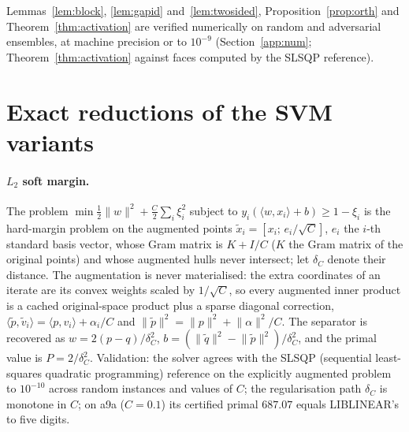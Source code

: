 \documentclass[pdflatex,sn-apa]{sn-jnl}%
\theoremstyle{thmstyleone}
\theoremstyle{thmstyletwo}
\newcommand{\ip}[2]{\langle #1, #2 \rangle}
\newcommand{\norm}[1]{\lVert #1 \rVert}
\begin{document}
Lemmas~\ref{lem:block}, \ref{lem:gapid} and~\ref{lem:twosided},
Proposition~\ref{prop:orth} and Theorem~\ref{thm:activation} are
verified numerically on random and adversarial ensembles, at machine
precision or to $10^{-9}$ (Section~\ref{app:num}; Theorem~\ref{thm:activation}
against faces computed by the SLSQP reference).



\section{Exact reductions of the SVM variants}\label{app:red}

\paragraph{$L_2$ soft margin.} The problem
$\min\tfrac12\norm w^2+\tfrac C2\sum_i\xi_i^2$ subject to
$y_i(\ip{w}{x_i}+b)\ge1-\xi_i$ is the hard-margin problem
on the augmented points $\tilde x_i=[x_i;\,e_i/\sqrt C]$, $e_i$ the
$i$-th standard basis vector, whose Gram
matrix is $K+I/C$ ($K$ the Gram matrix of the original points) and whose
augmented hulls never intersect; let $\delta_C$ denote their distance. The
augmentation is never materialised: the extra coordinates of an iterate
are its convex weights scaled by $1/\sqrt C$, so every augmented inner product is a
cached original-space product plus a sparse diagonal correction,
$\ip{\tilde p}{\tilde v_i}=\ip{p}{v_i}+\alpha_i/C$ and
$\norm{\tilde p}^2=\norm p^2+\norm\alpha^2/C$. The separator is recovered
as $w=2(p-q)/\delta_C^2$, $b=(\norm{\tilde q}^2-\norm{\tilde p}^2)/\delta_C^2$,
and the primal value is $P=2/\delta_C^2$. Validation: the solver agrees
with the SLSQP (sequential least-squares quadratic programming)
reference on the explicitly augmented problem to $10^{-10}$
across random instances and values of $C$; the regularisation path
$\delta_C$ is monotone in $C$; on a9a ($C{=}0.1$) its certified primal
$687.07$ equals LIBLINEAR's to five digits.
\end{document}
